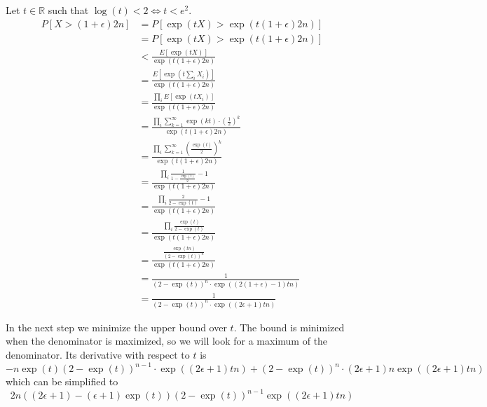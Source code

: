 \documentclass[10pt,a4paper]{article}
\begin{document}
Let $t \in \mathbb{R}$ such that $\log(t) < 2 \Leftrightarrow t < e^{2}$.
\begin{align*}
  P[X > (1 + \epsilon)2n] & = P\left[ \exp(tX) > \exp(t(1 + \epsilon)2n) \right]\\
                          & = P\left[ \exp(tX) > \exp(t(1 + \epsilon)2n) \right]\\
                          & < \frac{E[\exp(tX)]}{\exp(t(1 + \epsilon)2n)}\\
                          & = \frac{E[\exp(t \sum_{i} X_{i})]}{\exp(t(1 + \epsilon)2n)}\\
                          & = \frac{\prod_{i} E[\exp(tX_{i})]}{\exp(t(1 + \epsilon)2n)}\\
                          & = \frac{\prod_{i} \sum_{k = 1}^{\infty} \exp(kt) \cdot \left( \frac{1}{2} \right)^{k}}{\exp(t(1 + \epsilon)2n)}\\
                          & = \frac{\prod_{i} \sum_{k = 1}^{\infty} \left( \frac{\exp(t)}{2} \right)^{k}}{\exp(t(1 + \epsilon)2n)}\\
                          & = \frac{\prod_{i} \frac{1}{1 - \frac{\exp(t)}{2}} - 1}{\exp(t(1 + \epsilon)2n)}\\
                          & = \frac{\prod_{i} \frac{2}{2 - \exp(t)} - 1}{\exp(t(1 + \epsilon)2n)}\\
                          & = \frac{\prod_{i} \frac{\exp(t)}{2 - \exp(t)}}{\exp(t(1 + \epsilon)2n)}\\
                          & = \frac{\frac{\exp(tn)}{(2 - \exp(t))^{n}}}{\exp(t(1 + \epsilon)2n)}\\
                          & = \frac{1}{(2 - \exp(t))^{n} \cdot \exp\left( (2(1 + \epsilon) - 1)tn \right)}\\
                          & = \frac{1}{(2 - \exp(t))^{n} \cdot \exp\left( (2\epsilon + 1)tn \right)}
\end{align*}

In the next step we minimize the upper bound over $t$.
The bound is minimized when the denominator is maximized, so we will look for a maximum of the denominator.
Its derivative with respect to $t$ is
\begin{equation*}
  -n\exp(t)(2 - \exp(t))^{n - 1} \cdot \exp((2\epsilon + 1)tn) + (2 - \exp(t))^{n} \cdot (2\epsilon + 1)n \exp((2\epsilon + 1)tn)
\end{equation*}
which can be simplified to
\begin{equation*}
  2n\left( (2\epsilon + 1) - (\epsilon + 1)\exp(t) \right) (2 - \exp(t))^{n - 1} \exp((2\epsilon + 1)tn)
\end{equation*}
\end{document}

